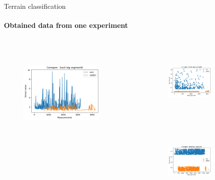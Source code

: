 \documentclass[aspectratio=169,xcolor=table]{beamer}
\begin{document}
\begin{frame}[t]{Terrain classification}
    \framesubtitle{Obtained data from one experiment}
    \begin{columns}[T,onlytextwidth]
        \begin{column}{0.49\textwidth}
            \begin{figure}[H]
                \centering\includegraphics[height=5cm,width=1\textwidth,keepaspectratio]{s_shape_leg/segment6_compare.png}
            \end{figure}
        \end{column}
        \begin{column}{0.49\textwidth}
            \vspace{-2.4cm}
            \begin{figure}[H]
                \begin{subfigure}{0.99\textwidth}
                    \centering\includegraphics[height=3.8cm,width=1\textwidth,keepaspectratio]{s_shape_leg/segment8_compare_front.png}
                \end{subfigure}

                \begin{subfigure}{0.99\textwidth}
                    \centering\includegraphics[height=3.8cm,width=1\textwidth,keepaspectratio]{s_shape_leg/segment6_compare_front.png}
                \end{subfigure}
            \end{figure}
        \end{column}
    \end{columns}
\end{frame}
\end{document}
